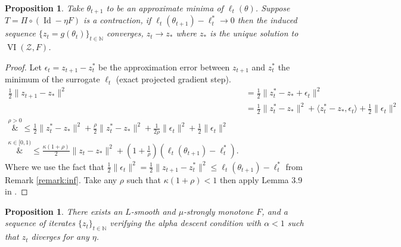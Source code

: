 \documentclass{article} %
\newtheorem{proposition}[theorem]{Proposition}
\theoremstyle{definition}
\newcommand{\nnumbers}{\mathbb{N}}
\newcommand{\vi}{\operatorname{VI}}
\newcommand{\id}{\operatorname{Id}}
\begin{document}
\begin{proposition}\label{thm:contraction-error-limit}
Take $\theta_{t+1}$ to be an approximate minima of $\ell_t(\theta)$. 
Suppose $T = \Pi \circ (\id - \eta F)$ is a contraction, if $\ell_t(\theta_{t+1})- \ell_t^\ast \to 0$ then the induced sequence $\{z_{t} = g(\theta_t)\}_{t \in \nnumbers}$ converges, $z_t \to z_{\ast}$ where $z_{\ast}$ is the unique solution to $\vi(\mathcal{Z}, F)$.
\end{proposition}

\begin{proof}
Let $\epsilon_t = z_{t+1}-z_t^\ast$  be the approximation error between $z_{t+1}$ and $z_t^\ast$ the minimum  of the surrogate $\ell_t$ (exact projected gradient step). 
    \begin{align*}
        \frac{1}{2}\| z_{t+1}-z_\ast\|^2 &= \frac{1}{2}\| z_{t}^\ast-z_\ast + \epsilon_t\|^2\\
        &= \frac{1}{2}\| z_{t}^\ast-z_\ast\|^2 + \langle z_{t}^\ast-z_\ast, \epsilon_t\rangle + \frac{1}{2}\|\epsilon_t\|^2\\
        \overset{\rho > 0}&{\leq} \frac{1}{2}\| z_{t}^\ast-z_\ast\|^2+\frac{\rho}{2}\| z_{t}^\ast-z_\ast\|^2 +\frac{1}{2\rho}\|\epsilon_t\|^2 + \frac{1}{2}\|\epsilon_t\|^2\\
        \overset{\kappa \in [0,1)}&{\leq} \frac{\kappa(1 + \rho)}{2} \| z_{t}-z_\ast\|^2 + (1+\frac{1}{\rho})(\ell_t(\theta_{t+1})-\ell_t^\ast).
        \end{align*}
Where we use the fact that $\frac{1}{2}\|\epsilon_t\|^2 = \frac{1}{2}\|z_{t+1}-z_t^\ast\|^2 \leq \ell_t(\theta_{t+1})-\ell_t^\ast$ from Remark \ref{remark:inf}.
Take any $\rho$ such that $\kappa(1 + \rho) <1$ then apply Lemma 3.9 in \cite{FRANCI2022161}.
\end{proof}
{
\renewcommand{\thetheorem}{\ref{prop:counter}}
\begin{proposition}
There exists an $L$-smooth and $\mu$-strongly monotone $F$, and a sequence of iterates $\{z_t\}_{t \in \nnumbers}$ verifying the alpha descent condition with  $\alpha < 1$  such that  $z_t$ diverges for any $\eta$.
\end{proposition}
}
\end{document}
